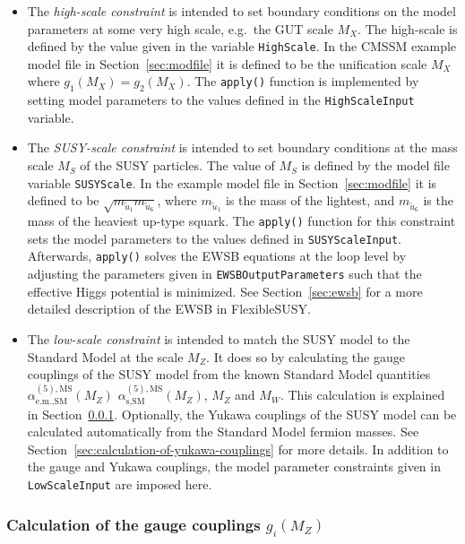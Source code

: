 \documentclass[final,3p,11pt,pdflatex]{elsarticle}
\makeatletter
\newcommand{\fs}{FlexibleSUSY\@\xspace}
\newcommand{\code}[1]{\lstinline|#1|}  %
\newcommand{\textoverline}[1]{$\overline{\mbox{#1}}$}
\newcommand{\MSbar}{\textoverline{MS}\xspace}
\newcommand{\secref}[1]{Section~\ref{#1}}
\makeatother
\begin{document}
\begin{itemize}
\item The \emph{high-scale constraint} is intended to set boundary
  conditions on the model parameters at some very high scale, e.g.\
  the GUT scale $M_X$.  The high-scale is defined by the value given
  in the variable \code{HighScale}.  In the CMSSM example model file
  in \secref{sec:modfile} it is defined to be the unification scale
  $M_X$ where $g_1(M_X) = g_2(M_X)$.  The \code{apply()} function is
  implemented by setting model parameters to the values defined in the
  \code{HighScaleInput} variable.

\item The \emph{SUSY-scale constraint} is intended to set boundary
  conditions at the mass scale $M_S$ of the SUSY particles.  The value
  of $M_S$ is defined by the model file variable \code{SUSYScale}.  In
  the example model file in \secref{sec:modfile} it is defined to be
  $\sqrt{m_{\tilde{u}_1} m_{\tilde{u}_6}}$, where $m_{\tilde{u}_1}$ is
  the mass of the lightest, and $m_{\tilde{u}_6}$ is the mass of the
  heaviest up-type squark.  The \code{apply()} function for this
  constraint sets the model parameters to the values defined in
  \code{SUSYScaleInput}.  Afterwards, \code{apply()} solves the EWSB
  equations at the loop level by adjusting the parameters given in
  \code{EWSBOutputParameters} such that the effective Higgs potential
  is minimized.  See \secref{sec:ewsb} for a more detailed description
  of the EWSB in \fs.

\item The \emph{low-scale constraint} is intended to match the SUSY
  model to the Standard Model at the scale $M_Z$.  It does so by
  calculating the gauge couplings of the SUSY model from the known
  Standard Model quantities
  $\alpha_{\text{e.m.},\text{SM}}^{(5),\text{\MSbar}}(M_Z)$
  $\alpha_{\text{s},\text{SM}}^{(5),\text{\MSbar}}(M_Z)$, $M_Z$ and
  $M_W$.  This calculation is explained in
  \secref{sec:calculation-of-gauge-couplings}.  Optionally, the Yukawa
  couplings of the SUSY model can be calculated automatically from the
  Standard Model fermion masses.  See
  \secref{sec:calculation-of-yukawa-couplings} for more details.  In
  addition to the gauge and Yukawa couplings, the model parameter
  constraints given in \code{LowScaleInput} are imposed here.
\end{itemize}

\subsubsection{Calculation of the gauge couplings $g_i(M_Z)$}
\label{sec:calculation-of-gauge-couplings}
\end{document}

